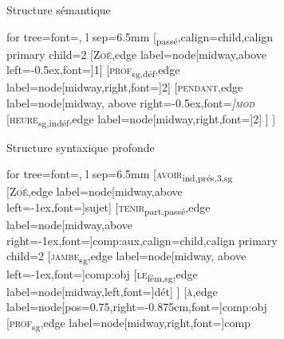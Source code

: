 \begin{figure}
\begin{subfigure}[h]{0.5\textwidth}
		\caption{Structure sémantique}
	\end{subfigure}%
	\vfill
	\begin{subfigure}[b]{0.5\textwidth}
		\begin{forest} for tree={font=\normalfont, l sep=6.5mm}
			[\textsubscript{passé},calign=child,calign primary child=2
				[\textsc{Zoé},edge label={node[midway,above left=-0.5ex,font=\footnotesize]{1}}]
				[\textsc{prof}\textsubscript{sg,déf},edge label={node[midway,right,font=\footnotesize]{2}}]
				[\textsc{pendant},edge label={node[midway, above right=-0.5ex,font=\footnotesize\itshape]{\textsc{mod}}}
					[\textsc{heure}\textsubscript{sg,indéf},edge label={node[midway,right,font=\footnotesize]{2}}]
				]
			]
		\end{forest}
		\caption{Structure syntaxique profonde}
	\end{subfigure}%
	\hfill
	\begin{subfigure}[b]{0.5\textwidth}
		\begin{forest} for tree={font=\normalfont, l sep=6.5mm}
			[\textsc{avoir}\textsubscript{ind,prés,3,sg}
				[\textsc{Zoé},edge label={node[midway,above left=-1ex,font=\footnotesize]{sujet}}]
				[\textsc{tenir}\textsubscript{part,passé},edge label={node[midway,above right=-1ex,font=\footnotesize]{comp{\NoAutoSpacing :}aux}},calign=child,calign primary child=2
					[\textsc{jambe}\textsubscript{sg},edge label={node[midway, above left=-1ex,font=\footnotesize]{comp{\NoAutoSpacing :}obj}}
						[\textsc{le}\textsubscript{fém,sg},edge label={node[midway,left,font=\footnotesize]{dét}}]
					]
					[\textsc{à},edge label={node[pos=0.75,right=-0.875cm,font=\footnotesize]{comp:obj}}
						[\textsc{prof}\textsubscript{sg},edge label={node[midway,right,font=\footnotesize]{comp}}

\end{forest}
\end{subfigure}
\end{figure}
